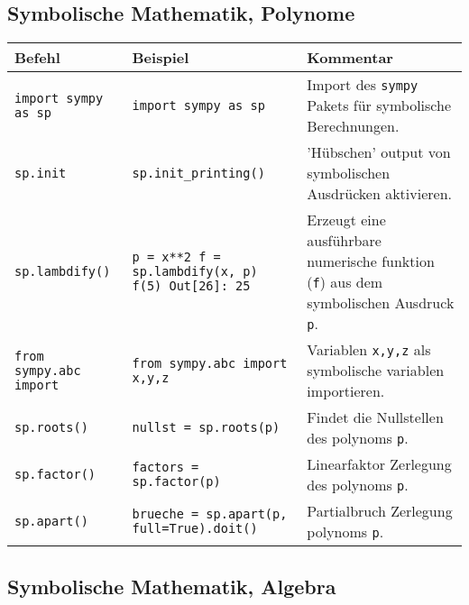 \subsection*{Symbolische Mathematik, Polynome}
\begin{table}[H]
    \centering
    \begin{tabular}{|p{3cm}|p{6cm}|p{6cm}|}
        \hline
    \textbf{Befehl} & \textbf{Beispiel} & \textbf{Kommentar} \\ \hline
    
    \texttt{import sympy as sp} & \texttt{import sympy as sp} & Import des \texttt{sympy} Pakets für symbolische Berechnungen. \\ \hline
    \texttt{sp.init} & \texttt{sp.init\_printing()} & 'Hübschen' output von symbolischen Ausdrücken aktivieren. \\ \hline
    \texttt{sp.lambdify()} & {\texttt{p = x**2 \newline 
f = sp.lambdify(x, p) \newline
f(5) \newline 
Out[26]: 25
}} & Erzeugt eine ausführbare numerische funktion (\texttt{f}) aus dem symbolischen Ausdruck \texttt{p}. \\ \hline
    \texttt{from sympy.abc import} & \texttt{from sympy.abc import x,y,z} & Variablen \texttt{x,y,z} als symbolische variablen importieren. \\ \hline
    \texttt{sp.roots()} & \texttt{nullst = sp.roots(p)} & Findet die Nullstellen des polynoms \texttt{p}. \\ \hline
    \texttt{sp.factor()} & \texttt{factors = sp.factor(p)} & Linearfaktor Zerlegung des polynoms \texttt{p}. \\ \hline
    \texttt{sp.apart()} & \texttt{brueche = sp.apart(p, full=True).doit()} & Partialbruch Zerlegung polynoms \texttt{p}. \\ \hline

    \end{tabular}
\end{table}

\subsection*{Symbolische Mathematik, Algebra}

